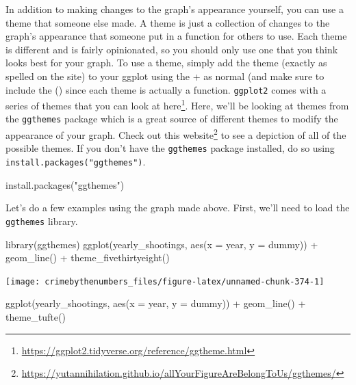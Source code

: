 \documentclass[
]{krantz}
\makeatletter
\newenvironment{Shaded}{\begin{snugshade}}{\end{snugshade}}
\newcommand{\AttributeTok}[1]{\textcolor[rgb]{0.61,0.61,0.61}{#1}}
\newcommand{\FunctionTok}[1]{\textcolor[rgb]{0,0,0}{#1}}
\newcommand{\NormalTok}[1]{#1}
\newcommand{\SpecialCharTok}[1]{\textcolor[rgb]{0,0,0}{#1}}
\newcommand{\StringTok}[1]{\textcolor[rgb]{0.5,0.5,0.5}{#1}}
\renewcommand{\href}[2]{#2\footnote{\url{#1}}}
\newenvironment{kframe}{%
\medskip{}
\setlength{\fboxsep}{.8em}
 \def\at@end@of@kframe{}%
 \ifinner\ifhmode%
  \def\at@end@of@kframe{\end{minipage}}%
  \begin{minipage}{\columnwidth}%
 \fi\fi%
 \def\FrameCommand##1{\hskip\@totalleftmargin \hskip-\fboxsep
 \colorbox{shadecolor}{##1}\hskip-\fboxsep
     \hskip-\linewidth \hskip-\@totalleftmargin \hskip\columnwidth}%
 \MakeFramed {\advance\hsize-\width
   \@totalleftmargin\z@ \linewidth\hsize
   \@setminipage}}%
 {\par\unskip\endMakeFramed%
 \at@end@of@kframe}
\renewenvironment{Shaded}{\begin{kframe}}{\end{kframe}}
\makeatother
\begin{document}
In addition to making changes to the graph's appearance yourself, you can use a theme that someone else made. A theme is just a collection of changes to the graph's appearance that someone put in a function for others to use. Each theme is different and is fairly opinionated, so you should only use one that you think looks best for your graph. To use a theme, simply add the theme (exactly as spelled on the site) to your ggplot using the + as normal (and make sure to include the () since each theme is actually a function. \texttt{ggplot2} comes with a series of themes that you can look at \href{https://ggplot2.tidyverse.org/reference/ggtheme.html}{here}. Here, we'll be looking at themes from the \texttt{ggthemes} package which is a great source of different themes to modify the appearance of your graph. Check out this \href{https://yutannihilation.github.io/allYourFigureAreBelongToUs/ggthemes/}{website} to see a depiction of all of the possible themes. If you don't have the \texttt{ggthemes} package installed, do so using \texttt{install.packages("ggthemes")}.

\begin{Shaded}
\begin{Highlighting}[]
\FunctionTok{install.packages}\NormalTok{(}\StringTok{"ggthemes"}\NormalTok{)}
\end{Highlighting}
\end{Shaded}

Let's do a few examples using the graph made above. First, we'll need to load the \texttt{ggthemes} library.

\begin{Shaded}
\begin{Highlighting}[]
\FunctionTok{library}\NormalTok{(ggthemes)}
\FunctionTok{ggplot}\NormalTok{(yearly\_shootings, }\FunctionTok{aes}\NormalTok{(}\AttributeTok{x =}\NormalTok{ year, }\AttributeTok{y =}\NormalTok{ dummy)) }\SpecialCharTok{+}
  \FunctionTok{geom\_line}\NormalTok{() }\SpecialCharTok{+}
  \FunctionTok{theme\_fivethirtyeight}\NormalTok{()}
\end{Highlighting}
\end{Shaded}

\begin{center}\texttt{[image: crimebythenumbers\_files/figure-latex/unnamed-chunk-374-1]} \end{center}

\begin{Shaded}
\begin{Highlighting}[]
\FunctionTok{ggplot}\NormalTok{(yearly\_shootings, }\FunctionTok{aes}\NormalTok{(}\AttributeTok{x =}\NormalTok{ year, }\AttributeTok{y =}\NormalTok{ dummy)) }\SpecialCharTok{+}
  \FunctionTok{geom\_line}\NormalTok{() }\SpecialCharTok{+}
  \FunctionTok{theme\_tufte}\NormalTok{()}
\end{Highlighting}
\end{Shaded}
\end{document}
